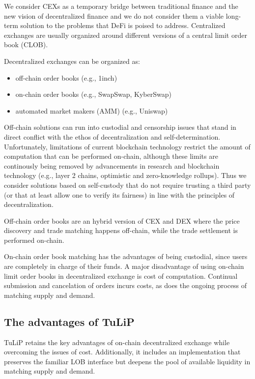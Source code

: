 \documentclass[11pt, reqno]{amsart}
\theoremstyle{definition}
\theoremstyle{remark}
\begin{document}
We consider CEXs as a temporary bridge between traditional finance and the
new vision of decentralized finance and we do not consider them a viable
long-term solution to the problems that DeFi is poised to address.
Centralized exchanges are usually organized around different versions of a
central limit order book (CLOB).

Decentralized exchanges can be organized as:
\begin{itemize}
	\item off-chain order books (e.g., 1inch)
	\item on-chain order books (e.g., SwapSwap, KyberSwap)
	\item automated market makers (AMM) (e.g., Uniswap)
\end{itemize}

Off-chain solutions can run into custodial and censorship issues that stand
in direct conflict with the ethos of decentralization and self-determination.
Unfortunately, limitations of current blockchain technology restrict
the amount of computation that can be performed on-chain, although these limits
are continously being removed by advancements in research and blockchain
technology (e.g., layer 2 chains, optimistic and zero-knowledge rollups).
Thus we consider solutions based on self-custody that do not require
trusting a third party (or that at least allow one to verify its fairness) in
line with the principles of decentralization.

Off-chain order books are an hybrid version of CEX and DEX where the price
discovery and trade matching happens off-chain, while the trade settlement is
performed on-chain.

On-chain order book matching has the advantages of being custodial, since users
are completely in charge of their funds.
A major disadvantage of using on-chain limit order books in decentralized
exchange is cost of computation. Continual submission and cancelation of orders
incurs costs, as does the ongoing process of matching supply and demand.

\subsection{The advantages of TuLiP}

TuLiP retains the key advantages of on-chain decentralized exchange while
overcoming the issues of cost. Additionally, it includes an implementation
that preserves the familiar LOB interface but deepens the pool of available
liquidity in matching supply and demand.
\end{document}
